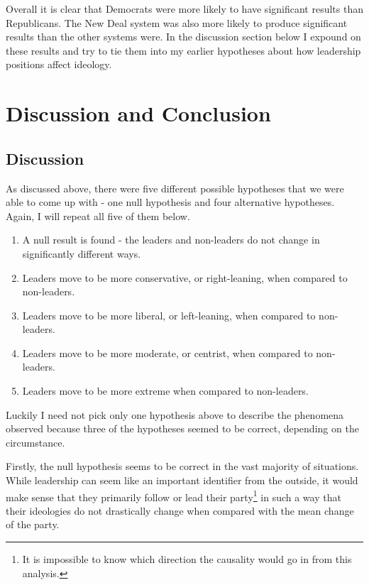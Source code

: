 \documentclass[12pt,twoside]{reedthesis}
\begin{document}
  Overall it is clear that Democrats were more likely to have significant
  results than Republicans. The New Deal system was also more likely to
  produce significant results than the other systems were. In the
  discussion section below I expound on these results and try to tie them
  into my earlier hypotheses about how leadership positions affect
  ideology.
  
  \chapter{Discussion and Conclusion}\label{discussion-and-conclusion}
  
  \section{Discussion}\label{discussion}
  
  As discussed above, there were five different possible hypotheses that
  we were able to come up with - one null hypothesis and four alternative
  hypotheses. Again, I will repeat all five of them below.
  
  \begin{enumerate}
  \def\labelenumi{\arabic{enumi}.}
  \itemsep1pt\parskip0pt
  \item
    A null result is found - the leaders and non-leaders do not change in
    significantly different ways.
  \item
    Leaders move to be more conservative, or right-leaning, when compared
    to non-leaders.
  \item
    Leaders move to be more liberal, or left-leaning, when compared to
    non-leaders.
  \item
    Leaders move to be more moderate, or centrist, when compared to
    non-leaders.
  \item
    Leaders move to be more extreme when compared to non-leaders.
  \end{enumerate}
  
  Luckily I need not pick only one hypothesis above to describe the
  phenomena observed because three of the hypotheses seemed to be correct,
  depending on the circumstance.
  
  Firstly, the null hypothesis seems to be correct in the vast majority of
  situations. While leadership can seem like an important identifier from
  the outside, it would make sense that they primarily follow or lead
  their
  party\footnote{It is impossible to know which direction the causality would go in from this analysis.}
  in such a way that their ideologies do not drastically change when
  compared with the mean change of the party.
  
\end{document}
